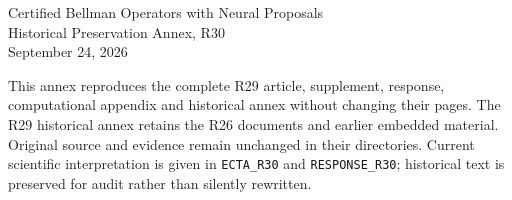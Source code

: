 \documentclass[12pt]{article}
\begin{document}
\thispagestyle{empty}
\begin{center}{\Large Certified Bellman Operators with Neural Proposals}\\[12pt]{\large Historical Preservation Annex, R30}\\[8pt]September 24, 2026\end{center}
This annex reproduces the complete R29 article, supplement, response, computational appendix and historical annex without changing their pages. The R29 historical annex retains the R26 documents and earlier embedded material. Original source and evidence remain unchanged in their directories. Current scientific interpretation is given in \texttt{ECTA\_R30} and \texttt{RESPONSE\_R30}; historical text is preserved for audit rather than silently rewritten.
\clearpage




\end{document}
